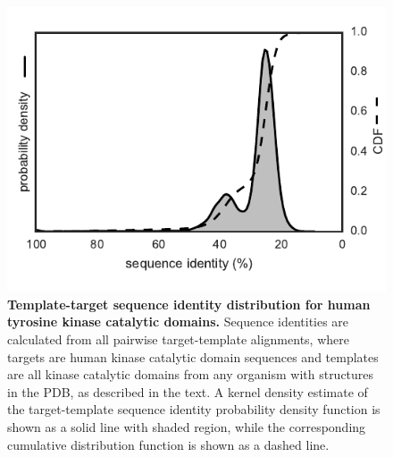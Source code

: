 \documentclass[aps,prl,preprint,nofootinbib,superscriptaddress,linenumbers]{revtex4-1}
\begin{document}
\begin{figure}[tb]
    \includegraphics[width=0.7\columnwidth]{seqid_dist/seqid_dist.pdf}

    \caption{\footnotesize {\bf Template-target sequence identity distribution for human tyrosine kinase catalytic domains.}
    Sequence identities are calculated from all pairwise target-template alignments, where targets are human kinase catalytic domain sequences and templates are all kinase catalytic domains from any organism with structures in the PDB, as described in the text.
    A kernel density estimate of the target-template sequence identity probability density function is shown as a solid line with shaded region, while the corresponding cumulative distribution function is shown as a dashed line.
    }
  \label{figure:sequence-identity-distribution}
\end{figure}

\end{document}
